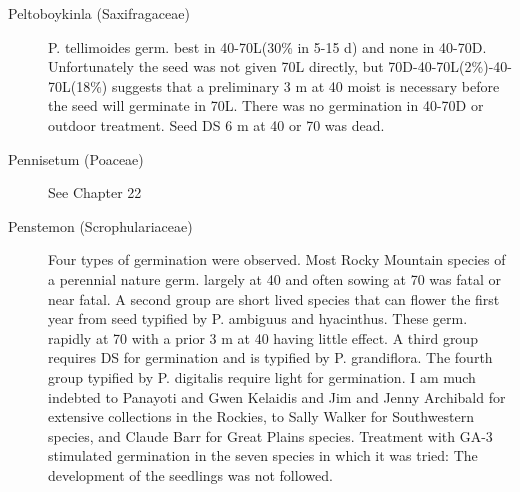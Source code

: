 \begin{description}
\item[Peltoboykinla (Saxifragaceae)] P. tellimoides germ. best in 40-70L(30\%
in 5-15 d) and none in 40-70D. Unfortunately the seed was not given 70L directly, but
70D-40-70L(2\%)-40-70L(18\%) suggests that a preliminary 3 m at 40 moist is
necessary before the seed will germinate in 70L. There was no germination in 40-70D
or outdoor treatment. Seed DS 6 m at 40 or 70 was dead.

\item[Pennisetum (Poaceae)] See Chapter 22
\item[Penstemon (Scrophulariaceae)] Four types of germination were observed.
Most Rocky Mountain species of a perennial nature germ. largely at 40 and often
sowing at 70 was fatal or near fatal. A second group are short lived species that can
flower the first year from seed typified by P. ambiguus and hyacinthus. These germ.
rapidly at 70 with a prior 3 m at 40 having little effect. A third group requires DS for
germination and is typified by P. grandiflora. The fourth group typified by P. digitalis
require light for germination. I am much indebted to Panayoti and Gwen Kelaidis and
Jim and Jenny Archibald for extensive collections in the Rockies, to Sally Walker for
Southwestern species, and Claude Barr for Great Plains species. Treatment with GA-3
stimulated germination in the seven species in which it was tried: The development of
the seedlings was not followed.


\end{description}
